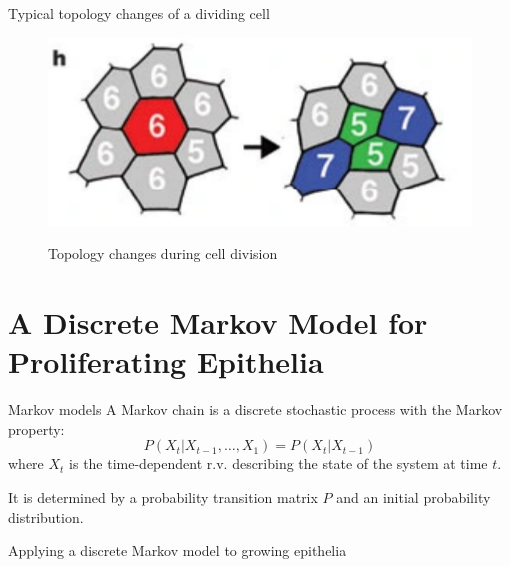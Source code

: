 \documentclass[aspectratio=169, 10pt]{beamer}
\begin{document}
\begin{frame}[fragile]{Typical topology changes of a dividing cell}
  \begin{figure}[]
    \centering
    \caption{Topology changes during cell division}
    \includegraphics[width=.5\textwidth]{figures/topology_evolution.png} 
    \label{}
  \end{figure}
\end{frame}

\section{A Discrete Markov Model for Proliferating Epithelia}

\begin{frame}[fragile]{Markov models}
    A Markov chain is a discrete stochastic process with the Markov property:
    \begin{equation*}
      P(X_t|X_{t-1},\ldots,X_1)=P(X_t|X_{t-1})
    \end{equation*}
    where $X_t$ is the time-dependent r.v. describing the state of the system at time $t$. 
    
    It is determined by a probability transition matrix $P$ and an initial probability distribution. 

\end{frame}

\begin{frame}[fragile]{Applying a discrete Markov model to growing epithelia}
  \begin{columns}
    \column{\textwidth}
    \begin{table}
      \centering
    \end{table}
  \end{columns}
\end{frame}
\end{document}
